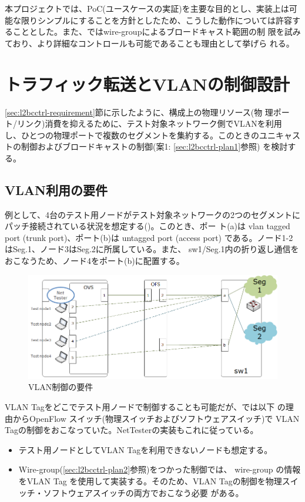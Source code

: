 本プロジェクトでは、PoC(ユースケースの実証)を主要な目的とし、実装上は可
能な限りシンプルにすることを方針としたため、こうした動作については許容す
ることとした。また、\lopjc ではwire-groupによるブロードキャスト範囲の制
限を試みており、より詳細なコントロールも可能であることも理由として挙げら
れる。


 \section{トラフィック転送とVLANの制御設計}
 \label{sec:vlan-ctrl}

\ref{sec:l2bcctrl-requirement}節に示したように、構成上の物理リソース(物
理ポート/リンク)消費を抑えるために、テスト対象ネットワーク側でVLANを利用
し、ひとつの物理ポートで複数のセグメントを集約する。このときのユニキャス
トの制御およびブロードキャストの制御(案1: \ref{sec:l2bcctrl-plan1}参照)
を検討する。

  \subsection{VLAN利用の要件}
  \label{sec:vlan-ctrl-req}

例として、4台のテスト用ノードがテスト対象ネットワークの2つのセグメントに
パッチ接続されている状況を想定する()。このとき、ポー
ト(a)は vlan tagged port (trunk port)、ポート(b)は untagged port (access
port) である。ノード1-2はSeg.1、ノード3はSeg.2に所属している。また、
sw1/Seg.1内の折り返し通信をおこなうため、ノード4をポート(b)に配置する。

\begin{figure}[h]
 \centering
 \includegraphics[scale=0.6]{img/vlan-req.png}
 \caption{VLAN制御の要件}
 \label{fig:vlan-req}
\end{figure}

VLAN Tagをどこでテスト用ノードで制御することも可能だが、\lopjc では以下
の理由からOpenFlow スイッチ(物理スイッチおよびソフトウェアスイッチ)で
VLAN Tagの制御をおこなっていた。NetTesterの実装もこれに従っている。
\begin{itemize}
 \item テスト用ノードとしてVLAN Tagを利用できないノードも想定する。
 \item Wire-group(\ref{sec:l2bcctrl-plan2}参照)をつかった制御では、
       wire-group の情報をVLAN Tag を使用して実装する。そのため、VLAN
       Tagの制御を物理スイッチ・ソフトウェアスイッチの両方でおこなう必要
       がある。
\end{itemize}

